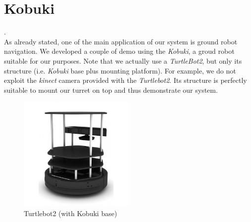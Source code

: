\section{Kobuki}
 \cite{kobuki}.\\
As already stated, one of the main application of our system is ground robot navigation. We developed a couple of demo using the \emph{Kobuki}, a groud robot suitable for our purposes. Note that we actually use a \emph{TurtleBot2}, but only its structure (i.e. \emph{Kobuki} base plus mounting platform). For example, we do not exploit the \emph{kinect} camera provided with the \emph{Turtlebot2}. Its structure is perfectly suitable to mount our turret on top and thus demonstrate our system.
\begin{figure}
	\centering
	\includegraphics[width=0.5\textwidth]{img/turtlebot.jpg}%
	\caption{Turtlebot2 (with Kobuki base)}
	\label{fig:turtlebot}
\end{figure}